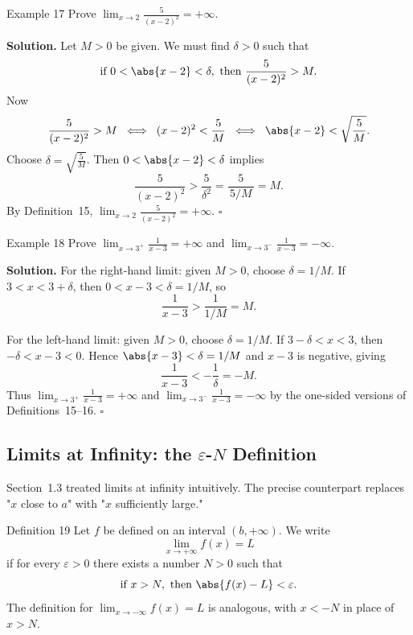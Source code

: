 \begin{examplebox}{Example 17}
Prove \(\displaystyle\lim_{x \to 2} \frac{5}{(x-2)^{2}} = +\infty\).

\medskip
\textbf{Solution.}
Let \(M > 0\) be given. We must find \(\delta > 0\) such that
\[
\text{if } 0 < \abs{x - 2} < \delta,\text{ then } \frac{5}{(x-2)^{2}} > M.
\]
Now
\[
\frac{5}{(x-2)^{2}} > M
\;\iff\; (x-2)^{2} < \frac{5}{M}
\;\iff\; \abs{x-2} < \sqrt{\frac{5}{M}}.
\]
Choose \(\delta = \sqrt{\frac{5}{M}}\). Then \(0 < \abs{x - 2} < \delta\) implies
\[
\frac{5}{(x-2)^{2}}
> \frac{5}{\delta^{2}}
= \frac{5}{\,5/M\,}
= M.
\]
By Definition~15, \(\displaystyle\lim_{x \to 2} \frac{5}{(x-2)^{2}} = +\infty\). \(\square\)
\end{examplebox}

\begin{examplebox}{Example 18}
Prove \(\displaystyle\lim_{x \to 3^{+}} \frac{1}{x-3} = +\infty\) and \(\displaystyle\lim_{x \to 3^{-}} \frac{1}{x-3} = -\infty\).

\medskip
\textbf{Solution.}
For the right-hand limit: given \(M > 0\), choose \(\delta = 1/M\). If \(3 < x < 3 + \delta\), then \(0 < x - 3 < \delta = 1/M\), so
\[
\frac{1}{x-3} > \frac{1}{1/M} = M.
\]

For the left-hand limit: given \(M > 0\), choose \(\delta = 1/M\). If \(3 - \delta < x < 3\), then \(-\delta < x-3 < 0\). Hence \(\abs{x-3} < \delta = 1/M\) and \(x-3\) is negative, giving
\[
\frac{1}{x-3} < -\frac{1}{\delta} = -M.
\]
Thus \(\lim_{x \to 3^{+}} \frac{1}{x-3} = +\infty\) and \(\lim_{x \to 3^{-}} \frac{1}{x-3} = -\infty\) by the one-sided versions of Definitions~15--16. \(\square\)
\end{examplebox}

\subsection*{Limits at Infinity: the \texorpdfstring{\(\varepsilon\)-\(N\)}{epsilon-N} Definition}
\label{subsec:1.4.6}

Section~1.3 treated limits at infinity intuitively. The precise counterpart replaces "\(x\) close to \(a\)" with "\(x\) sufficiently large."

\begin{definitionbox}{Definition 19}
Let \(f\) be defined on an interval \((b, +\infty)\). We write
\[
\lim_{x \to +\infty} f(x) = L
\]
if for every \(\varepsilon > 0\) there exists a number \(N > 0\) such that
\[
\text{if } x > N,\text{ then } \abs{f(x) - L} < \varepsilon.
\]
The definition for \(\lim_{x \to -\infty} f(x) = L\) is analogous, with \(x < -N\) in place of \(x > N\).
\end{definitionbox}


